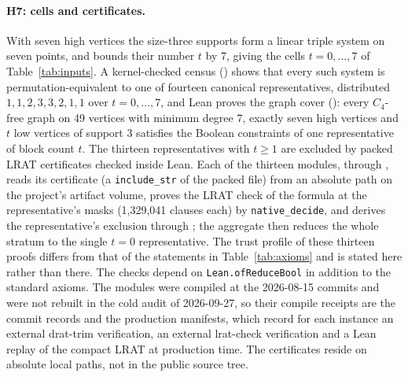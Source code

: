 \documentclass{anvil-paper}
\theoremstyle{definition}
\begin{document}
\paragraph{H7: cells and certificates.} With seven high vertices the size-three supports form a linear triple system on seven points, and  bounds their number $t$ by 7, giving the cells $t=0,\dots,7$ of Table~\ref{tab:inputs}. A kernel-checked census () shows that every such system is permutation-equivalent to one of fourteen canonical representatives, distributed $1,1,2,3,3,2,1,1$ over $t=0,\dots,7$, and Lean proves the graph cover (): every $C_4$-free graph on 49 vertices with minimum degree 7, exactly seven high vertices and $t$ low vertices of support 3 satisfies the Boolean constraints of one representative of block count $t$. The thirteen representatives with $t\ge 1$ are excluded by packed LRAT certificates checked inside Lean. Each of the thirteen modules,  through , reads its certificate (a \verb|include_str| of the packed file) from an absolute path on the project's artifact volume, proves the LRAT check of the formula  at the representative's masks (1,329,041 clauses each) by \texttt{native\_decide}, and derives the representative's exclusion through ; the aggregate  then reduces the whole stratum to the single $t=0$ representative. The trust profile of these thirteen proofs differs from that of the statements in Table~\ref{tab:axioms} and is stated here rather than there. The checks depend on \texttt{Lean.ofReduceBool} in addition to the standard axioms. The modules were compiled at the 2026-08-15 commits and were not rebuilt in the cold audit of 2026-09-27, so their compile receipts are the commit records and the production manifests, which record for each instance an external drat-trim verification, an external lrat-check verification and a Lean replay of the compact LRAT at production time. The certificates reside on absolute local paths, not in the public source tree.
\end{document}
